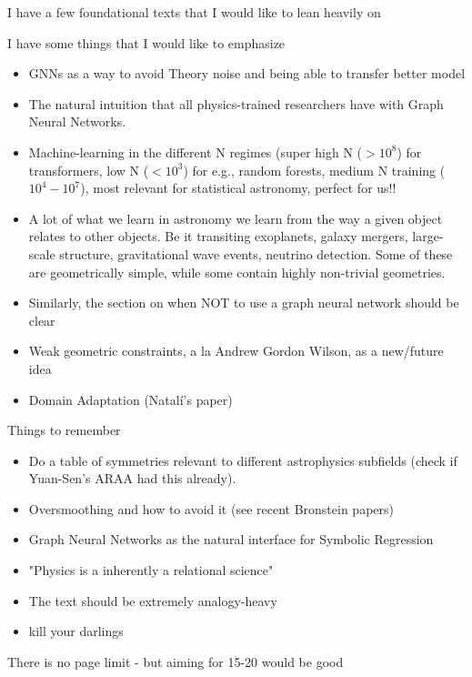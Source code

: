 I have a few foundational texts that I would like to lean heavily on


I have some things that I would like to emphasize

\begin{itemize}
    \item GNNs as a way to avoid Theory noise and being able to transfer better model
    \item The natural intuition that all physics-trained researchers have with Graph Neural Networks. 
    \item Machine-learning in the different N regimes (super high N ($>10^8$) for transformers, low N ($<10^3$) for e.g., random forests, medium N training ($10^4-10^7$), most relevant for statistical astronomy, perfect for us!!
    \item A lot of what we learn in astronomy we learn from the way a given object relates to other objects. Be it transiting exoplanets, galaxy mergers, large-scale structure, gravitational wave events, neutrino detection. Some of these are geometrically simple, while some contain highly non-trivial geometries.
    \item Similarly, the section on when NOT to use a graph neural network should be clear
    \item Weak geometric constraints, a la Andrew Gordon Wilson, as a new/future idea
    \item Domain Adaptation (Natalí's paper)
    
\end{itemize}

Things to remember

\begin{itemize}
    \item Do a table of symmetries relevant to different astrophysics subfields (check if Yuan-Sen's ARAA had this already).
    \item Oversmoothing and how to avoid it (see recent Bronstein papers)
    \item Graph Neural Networks as the natural interface for Symbolic Regression
    \item "Physics is a inherently a relational science"
    \item The text should be extremely analogy-heavy
    \item kill your darlings
\end{itemize}


There is no page limit - but aiming for 15-20 would be good